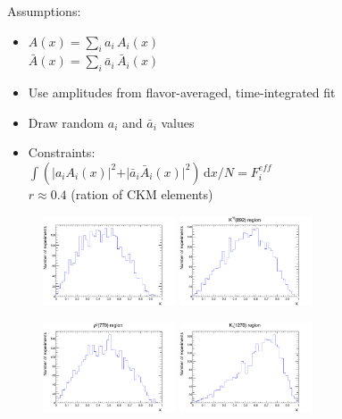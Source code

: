 Assumptions:
	\begin{itemize}
		\item   $A(x) = \sum_i a_i \, A_i(x)$   \\
		 $\bar A(x) = \sum_i \bar a_i \, \bar A_i(x)$
		\item Use amplitudes from flavor-averaged, time-integrated fit
		 \item Draw random $a_i$ and $\bar a_i $ values
		 \item Constraints: \\
		 $\int ( \vert a_i  A_i(x) \vert^2 + \vert \bar a_i  \bar A_i(x) \vert^2 ) \, \text{d}x / N = F^{eff}_i $ \\
		 $r \approx 0.4 $ (ration of CKM elements)
	\end{itemize}
	
\begin{figure}[hp]
	\centering
		\includegraphics[width=0.35\textwidth, height = 3.cm]{figs/plots/k-eps-converted-to.pdf} 
		\includegraphics[width=0.35\textwidth, height = 3.cm]{figs/plots/k_Ks-eps-converted-to.pdf} 
		
		\includegraphics[width=0.35\textwidth, height = 3.cm]{figs/plots/k_rho-eps-converted-to.pdf} 
		\includegraphics[width=0.35\textwidth, height = 3.cm]{figs/plots/k_K1-eps-converted-to.pdf} 	
		\caption{}	
\end{figure}		

